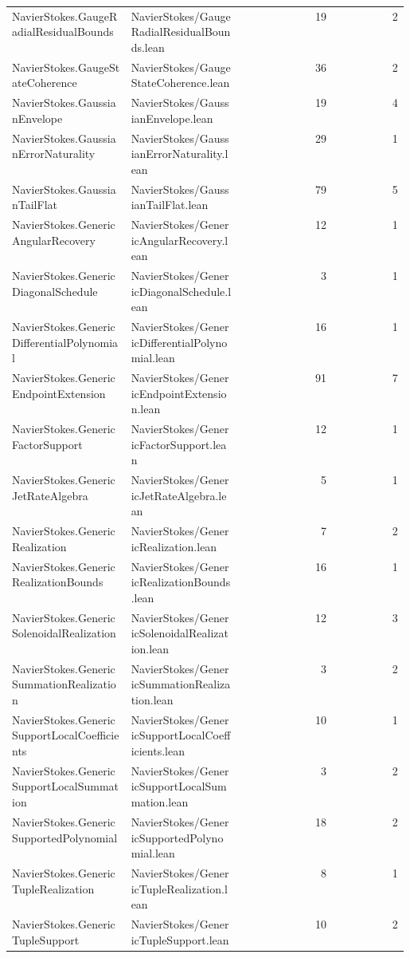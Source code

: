 \begin{longtable}{p{0.30\linewidth}p{0.28\linewidth}rr}
NavierStokes.GaugeRadialResidualBounds & NavierStokes/GaugeRadialResidualBounds.lean & 19 & 2\\
NavierStokes.GaugeStateCoherence & NavierStokes/GaugeStateCoherence.lean & 36 & 2\\
NavierStokes.GaussianEnvelope & NavierStokes/GaussianEnvelope.lean & 19 & 4\\
NavierStokes.GaussianErrorNaturality & NavierStokes/GaussianErrorNaturality.lean & 29 & 1\\
NavierStokes.GaussianTailFlat & NavierStokes/GaussianTailFlat.lean & 79 & 5\\
NavierStokes.GenericAngularRecovery & NavierStokes/GenericAngularRecovery.lean & 12 & 1\\
NavierStokes.GenericDiagonalSchedule & NavierStokes/GenericDiagonalSchedule.lean & 3 & 1\\
NavierStokes.GenericDifferentialPolynomial & NavierStokes/GenericDifferentialPolynomial.lean & 16 & 1\\
NavierStokes.GenericEndpointExtension & NavierStokes/GenericEndpointExtension.lean & 91 & 7\\
NavierStokes.GenericFactorSupport & NavierStokes/GenericFactorSupport.lean & 12 & 1\\
NavierStokes.GenericJetRateAlgebra & NavierStokes/GenericJetRateAlgebra.lean & 5 & 1\\
NavierStokes.GenericRealization & NavierStokes/GenericRealization.lean & 7 & 2\\
NavierStokes.GenericRealizationBounds & NavierStokes/GenericRealizationBounds.lean & 16 & 1\\
NavierStokes.GenericSolenoidalRealization & NavierStokes/GenericSolenoidalRealization.lean & 12 & 3\\
NavierStokes.GenericSummationRealization & NavierStokes/GenericSummationRealization.lean & 3 & 2\\
NavierStokes.GenericSupportLocalCoefficients & NavierStokes/GenericSupportLocalCoefficients.lean & 10 & 1\\
NavierStokes.GenericSupportLocalSummation & NavierStokes/GenericSupportLocalSummation.lean & 3 & 2\\
NavierStokes.GenericSupportedPolynomial & NavierStokes/GenericSupportedPolynomial.lean & 18 & 2\\
NavierStokes.GenericTupleRealization & NavierStokes/GenericTupleRealization.lean & 8 & 1\\
NavierStokes.GenericTupleSupport & NavierStokes/GenericTupleSupport.lean & 10 & 2\\

\end{longtable}
